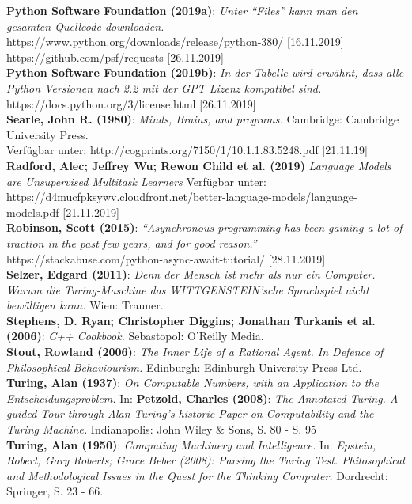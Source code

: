 \documentclass[10pt,a4paper]{article}
\begin{document}
\textbf{Python Software Foundation (2019a)}: \textit{Unter \enquote{Files} kann man den gesamten Quellcode downloaden.} \\ https://www.python.org/downloads/release/python-380/ [16.11.2019] \\
https://github.com/psf/requests [26.11.2019] \\
\textbf{Python Software Foundation (2019b)}: \textit{In der Tabelle wird erwähnt, dass alle Python Versionen nach 2.2 mit der GPT Lizenz kompatibel sind.} https://docs.python.org/3/license.html [26.11.2019] \\
\textbf{Searle, John R. (1980)}: \textit{Minds, Brains, and programs.} Cambridge: Cambridge University Press. \\ Verfügbar unter: http://cogprints.org/7150/1/10.1.1.83.5248.pdf [21.11.19]
\textbf{Radford, Alec; Jeffrey Wu; Rewon Child et al. (2019)} \textit{Language Models are Unsupervised Multitask Learners} Verfügbar unter: \\ https://d4mucfpksywv.cloudfront.net/better-language-models/language-models.pdf [21.11.2019] \\
\textbf{Robinson, Scott (2015)}: \textit{\enquote{Asynchronous programming has been gaining a lot of traction in the past few years, and for good reason.}} \\
https://stackabuse.com/python-async-await-tutorial/ [28.11.2019] \\
\textbf{Selzer, Edgard (2011)}: \textit{Denn der Mensch ist mehr als nur ein Computer. Warum die Turing-Maschine das WITTGENSTEIN'sche Sprachspiel nicht bewältigen kann.} Wien: Trauner. \\
\textbf{Stephens, D. Ryan; Christopher Diggins; Jonathan Turkanis et al. (2006)}: \textit{C++ Cookbook.} Sebastopol: O'Reilly Media. \\
\textbf{Stout, Rowland (2006)}: \textit{The Inner Life of a Rational Agent. In Defence of Philosophical Behaviourism.} Edinburgh: Edinburgh University Press Ltd. \\
\textbf{Turing, Alan (1937)}: \textit{On Computable Numbers, with an Application to the Entscheidungsproblem.} In: \textbf{Petzold, Charles (2008)}: \textit{The Annotated Turing. A guided Tour through Alan Turing’s historic Paper on Computability and the Turing Machine.} Indianapolis: John Wiley \& Sons, S. 80 - S. 95 \\
\textbf{Turing, Alan (1950)}: \textit{Computing Machinery and Intelligence.} In: \textit{Epstein, Robert; Gary Roberts; Grace Beber (2008): Parsing the Turing Test.  Philosophical and Methodological Issues in the Quest for the Thinking Computer.} Dordrecht: Springer, S. 23 - 66. \\
\end{document}
